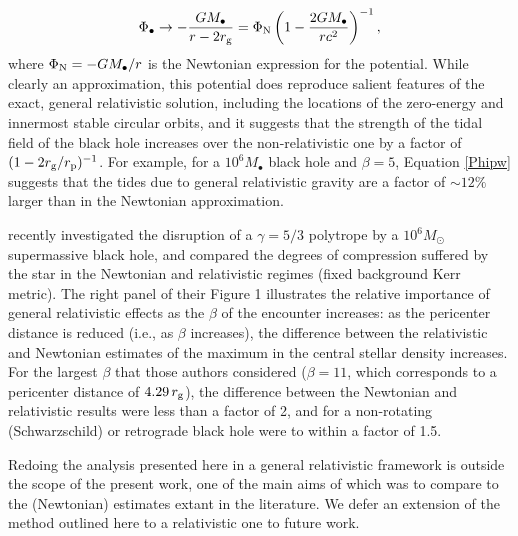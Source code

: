 \documentclass[twocolumn]{aastex62}
\begin{document}
\begin{equation}
\Phi_{\bullet} \rightarrow -\frac{GM_{\bullet}}{r-2r_{\rm g}} = \Phi_{\rm N}\left(1-\frac{2GM_{\bullet}}{rc^2}\right)^{-1}, \label{Phipw}
\end{equation}
where $\Phi_{\rm N} = -GM_{\bullet}/r$ is the Newtonian expression for the potential. While clearly an approximation, this potential does reproduce salient features of the exact, general relativistic solution, including the locations of the zero-energy and innermost stable circular orbits, and it suggests that the strength of the tidal field of the black hole increases over the non-relativistic one by a factor of $(1-2r_{\rm g}/r_{\rm p})^{-1}$. For example, for a $10^{6}M_{\bullet}$ black hole and $\beta = 5$, Equation \eqref{Phipw} suggests that the tides due to general relativistic gravity are a factor of $\sim 12\%$ larger than in the Newtonian approximation. 

\citet{gafton19} recently investigated the disruption of a $\gamma = 5/3$ polytrope by a $10^6M_{\odot}$ supermassive black hole, and compared the degrees of compression suffered by the star in the Newtonian and relativistic regimes (fixed background Kerr metric). The right panel of their Figure 1 illustrates the relative importance of general relativistic effects as the $\beta$ of the encounter increases: as the pericenter distance is reduced (i.e., as $\beta$ increases), the difference between the  relativistic and Newtonian estimates of the maximum in the central stellar density increases. For the largest $\beta$ that those authors considered ($\beta = 11$, which corresponds to a pericenter distance of $4.29\, r_{\rm g}$), the difference between the Newtonian and relativistic results were less than a factor of 2, and for a non-rotating (Schwarzschild) or retrograde black hole were to within a factor of 1.5.

Redoing the analysis presented here in a general relativistic framework is outside the scope of the present work, one of the main aims of which was to compare to the (Newtonian) estimates extant in the literature. We defer an extension of the method outlined here to a relativistic one to future work.
\end{document}

